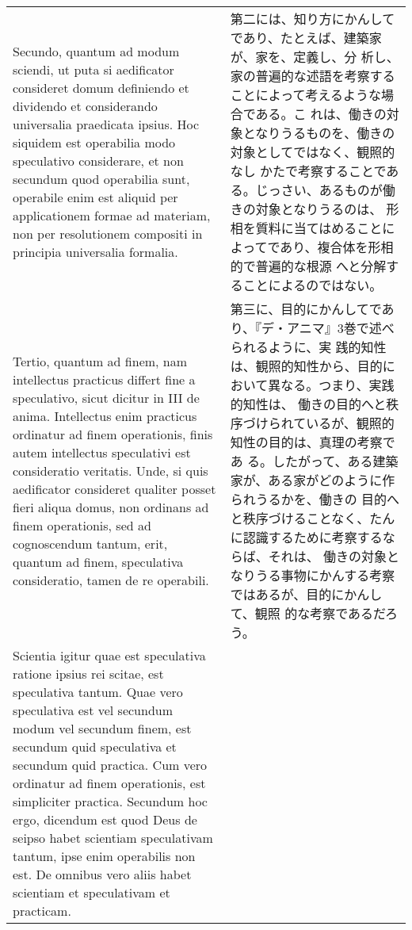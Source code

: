 \documentclass[10pt]{jsarticle} %
\begin{document}
\begin{longtable}{p{21em}p{21em}}
\\


Secundo, quantum ad
modum sciendi, ut puta si aedificator consideret domum definiendo et
dividendo et considerando universalia praedicata ipsius. Hoc siquidem
est operabilia modo speculativo considerare, et non secundum quod
operabilia sunt, operabile enim est aliquid per applicationem formae ad
materiam, non per resolutionem compositi in principia universalia
formalia. 


&

第二には、知り方にかんしてであり、たとえば、建築家が、家を、定義し、分
析し、家の普遍的な述語を考察することによって考えるような場合である。こ
れは、働きの対象となりうるものを、働きの対象としてではなく、観照的なし
かたで考察することである。じっさい、あるものが働きの対象となりうるのは、
形相を質料に当てはめることによってであり、複合体を形相的で普遍的な根源
へと分解することによるのではない。

\\


Tertio, quantum ad finem, nam intellectus practicus differt
fine a speculativo, sicut dicitur in III de anima. Intellectus enim
practicus ordinatur ad finem operationis, finis autem intellectus
speculativi est consideratio veritatis. Unde, si quis aedificator
consideret qualiter posset fieri aliqua domus, non ordinans ad finem
operationis, sed ad cognoscendum tantum, erit, quantum ad finem,
speculativa consideratio, tamen de re operabili. 


&

第三に、目的にかんしてであり、『デ・アニマ』3巻で述べられるように、実
践的知性は、観照的知性から、目的において異なる。つまり、実践的知性は、
働きの目的へと秩序づけられているが、観照的知性の目的は、真理の考察であ
る。したがって、ある建築家が、ある家がどのように作られうるかを、働きの
目的へと秩序づけることなく、たんに認識するために考察するならば、それは、
働きの対象となりうる事物にかんする考察ではあるが、目的にかんして、観照
的な考察であるだろう。


\\


Scientia igitur quae
est speculativa ratione ipsius rei scitae, est speculativa tantum. Quae
vero speculativa est vel secundum modum vel secundum finem, est secundum
quid speculativa et secundum quid practica. Cum vero ordinatur ad finem
operationis, est simpliciter practica. Secundum hoc ergo, dicendum est
quod Deus de seipso habet scientiam speculativam tantum, ipse enim
operabilis non est. De omnibus vero aliis habet scientiam et
speculativam et practicam. 




\end{longtable}
\end{document}
